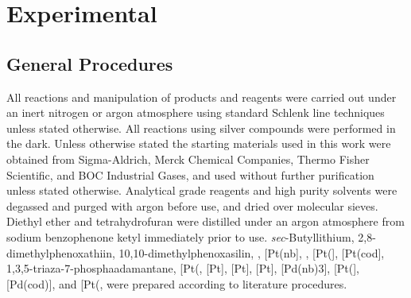 
\chapter{Experimental}
\label{ch:expt}

\section{General Procedures}
\label{section:generalprocedures}

\setlength{\emergencystretch}{2pt}

\begin{sloppypar}
All reactions and manipulation of products and reagents were carried out under an inert nitrogen or argon atmosphere using standard Schlenk line techniques unless stated otherwise.  All reactions using silver compounds were performed in the dark.  Unless otherwise stated the starting materials used in this work were obtained from Sigma-Aldrich, Merck Chemical Companies, Thermo Fisher Scientific, and BOC Industrial Gases, and used without further purification unless stated otherwise.  Analytical grade reagents and high purity solvents were degassed and purged with argon before use, and dried over molecular sieves.  Diethyl ether and tetrahydrofuran were distilled under an argon atmosphere from sodium benzophenone ketyl immediately prior to use.  
\emph{sec}-Butyllithium,\cite{Dieter2001} 
2,8-di\-methyl\-phenoxathiin,\cite{Suter1938} 
10,10-dimethyl\-phenoxasilin,\cite{Kranenburg1995} 
,\cite{Koshar1973} 
[Pt(nb],\cite{Vaughan2011}
,\cite{Giordano1979}
 [Pt(],\cite{Spencer1979} 
[Pt(cod],\cite{Crascall1990} 
1,3,5-triaza-7-phosphaadamantane,\cite{Daigle1998a} 
[Pt(\ce{C6H10)Cl2]},\cite{Jensen1953} 
[Pt],\cite{Albrecht2000} 
[Pt],\cite{Hartley1979} 
[Pt],\cite{Cramer1967}
[Pd(nb{)3}]\cite{Green1977}, 
[Pt(],\cite{Bradthesis}
[Pd(cod)],
and [Pt(\ce{C6H10)Me2]},\cite{Vaughan2011}
were prepared according to literature procedures.  
\end{sloppypar}

